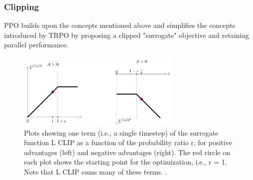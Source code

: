 \subsubsection{Clipping}
PPO builds upon the concepts mentioned above and simplifies the concepts introduced by TRPO by proposing a clipped "surrogate" objective and retaining parallel performance. 

\begin{figure}[!ht]
    \centering
    \includegraphics[width=0.7\textwidth]{images/LCLIP_PPO.png}
    \caption{Plots showing one term (i.e., a single timestep) of the surrogate function L CLIP as a function of the probability ratio r, for positive advantages (left) and negative advantages (right). The red circle on each plot shows the starting point for the optimization, i.e., r = 1. Note that L CLIP sums many of these terms.
    \cite{schulman2017proximal}.
    }
    \label{fig:LCLIP}
\end{figure}

